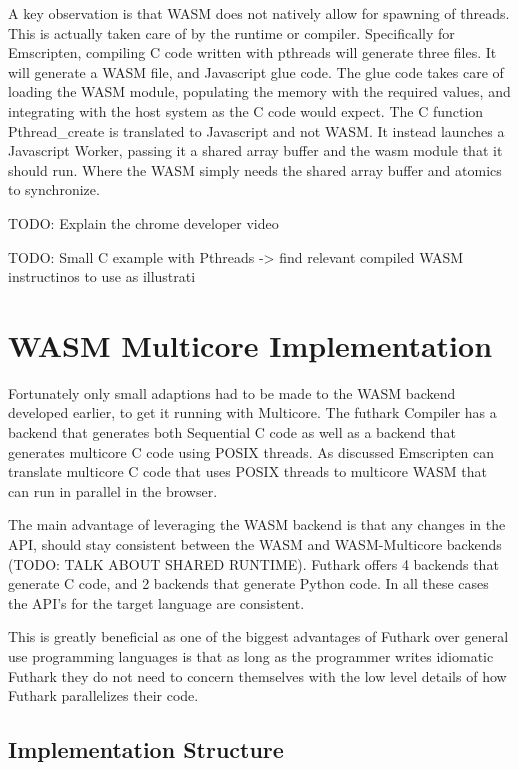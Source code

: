 \documentclass[11pt]{article}
\begin{document}
A key observation is that WASM does not natively allow for spawning of threads. This is actually taken care of by the runtime or compiler. Specifically for Emscripten, compiling C code written with pthreads will generate three files. It will generate a WASM file, and Javascript glue code. The glue code takes care of loading the WASM module, populating the memory with the required values, and integrating with the host system as the C code would expect. The C function Pthread\_create is translated to Javascript and not WASM. It instead launches a Javascript Worker, passing it a shared array buffer and the wasm module that it should run. Where the WASM simply needs the shared array buffer and atomics to synchronize.  


TODO: Explain the chrome developer video

TODO: Small C example with Pthreads -> find relevant compiled WASM instructinos to use as illustrati

\newpage

\section{WASM Multicore Implementation}


Fortunately only small adaptions had to be made to the WASM backend developed earlier, to get it running with Multicore. The futhark Compiler has a backend that generates both Sequential C code as well as a backend that generates multicore C code using POSIX threads. As discussed Emscripten can translate multicore C code that uses POSIX threads to multicore WASM that can run in parallel in the browser. 

The main advantage of leveraging the WASM backend is that any changes in the API, should stay consistent between the WASM and WASM-Multicore backends (TODO: TALK ABOUT SHARED RUNTIME). Futhark offers 4 backends that generate C code, and 2 backends that generate Python code. In all these cases the API's for the target language are consistent. 


This is greatly beneficial as one of the biggest advantages of Futhark over general use programming languages is that as long as the programmer writes idiomatic Futhark they do not need to concern themselves with the low level details of how Futhark parallelizes their code. 



\subsection{Implementation Structure}
\end{document}
